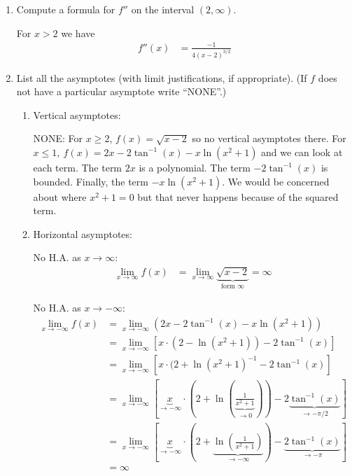 \documentclass{ximera}
\begin{document}
\begin{problem}
\begin{enumerate}
    \item Compute a formula for $f''$ on the interval $(2, \infty)$.
\begin{explanation}
        For $x>2$ we have
        \begin{align*}
          f''(x) &= \frac{-1}{4(x-2)^{3/2}}
        \end{align*}
      \end{explanation}

\item List all the asymptotes (with limit justifications, if appropriate).
      (If $f$ does not have a particular asymptote write ``NONE''.)
      \begin{enumerate}
        \item
          Vertical asymptotes:
\begin{explanation}
            NONE: For $x \ge 2$, $f(x)=\sqrt{x - 2}$ so no vertical asymptotes there.  For $x \le 1,\ f(x)= 2x - 2\tan^{-1}(x) - x \ln(x^2+1)$ and we can look at each term.  The term $2x$ is a polynomial.  The term $- 2\tan^{-1}(x)$ is bounded.  Finally, the term $- x \ln(x^2+1)$.  We would be concerned about where $x^2+1=0$ but that never happens because of the squared term.
          \end{explanation}

        \item
          Horizontal asymptotes:
\begin{explanation}
            No H.A. as $x \to \infty$:
            \begin{align*}
              \lim_{x\to\infty} f(x) &= \lim_{x \to \infty} \underbrace{\sqrt{x-2}}_{\text{form $\infty$}} = \infty
            \end{align*}

            No H.A. as $x \to -\infty$:
            \begin{align*}
              \lim_{x \to -\infty} f(x) &= \lim_{x \to -\infty} (2x - 2\tan^{-1}(x) - x \ln(x^2+1))\\
              &= \lim_{x \to -\infty} \left[x\cdot(2 - \ln(x^2+1)) - 2\tan^{-1}(x)\right]\\
              &= \lim_{x \to -\infty} \left[x \cdot(2 + \ln(x^2+1)^{-1} -2\tan^{-1}(x) \right]\\
              &= \lim_{x \to -\infty} \left[\underbrace{x}_{\text{$\to -\infty$}} \cdot \left(2 + \ln\left(\underbrace{\frac{1}{x^2+1}}_{\text{$\to 0$}}\right)\right) -2\underbrace{\tan^{-1}(x)}_{\text{$\to -\pi/2$}} \right]\\
              &= \lim_{x \to -\infty} \left[\underbrace{x}_{\text{$\to -\infty$}} \cdot \left( 2 + \underbrace{ \ln\left(\frac{1}{x^2+1}\right)}_{\to -\infty}\right) -\underbrace{2\tan^{-1}(x)}_{\text{$\to -\pi$}} \right]\\
              &= \infty
            \end{align*}
          \end{explanation}
      \end{enumerate}


\end{enumerate}
\end{problem}
\end{document}
